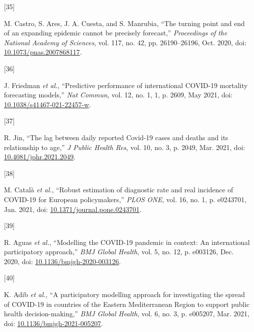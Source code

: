 \documentclass[
]{article}
\newlength{\cslhangindent}
\newlength{\csllabelwidth}
\newlength{\cslentryspacingunit} %
\newenvironment{CSLReferences}[2] %
 {%
  \setlength{\parindent}{0pt}
  \ifodd #1
  \let\oldpar\par
  \def\par{\hangindent=\cslhangindent\oldpar}
  \fi
  \setlength{\parskip}{#2\cslentryspacingunit}
 }%
 {}
\newcommand{\CSLLeftMargin}[1]{\parbox[t]{\csllabelwidth}{#1}}
\newcommand{\CSLRightInline}[1]{\parbox[t]{\linewidth - \csllabelwidth}{#1}\break}
\begin{document}
\begin{CSLReferences}{0}{0}
\leavevmode{}%
\CSLLeftMargin{{[}35{]} }
\CSLRightInline{M. Castro, S. Ares, J. A. Cuesta, and S. Manrubia,
{``The turning point and end of an expanding epidemic cannot be
precisely forecast,''} \emph{Proceedings of the National Academy of
Sciences}, vol. 117, no. 42, pp. 26190--26196, Oct. 2020, doi:
\href{https://doi.org/10.1073/pnas.2007868117}{10.1073/pnas.2007868117}.}

\leavevmode{}%
\CSLLeftMargin{{[}36{]} }
\CSLRightInline{J. Friedman \emph{et al.}, {``Predictive performance of
international {COVID-19} mortality forecasting models,''} \emph{Nat
Commun}, vol. 12, no. 1, 1, p. 2609, May 2021, doi:
\href{https://doi.org/10.1038/s41467-021-22457-w}{10.1038/s41467-021-22457-w}.}

\leavevmode{}%
\CSLLeftMargin{{[}37{]} }
\CSLRightInline{R. Jin, {``The lag between daily reported {Covid-19}
cases and deaths and its relationship to age,''} \emph{J Public Health
Res}, vol. 10, no. 3, p. 2049, Mar. 2021, doi:
\href{https://doi.org/10.4081/jphr.2021.2049}{10.4081/jphr.2021.2049}.}

\leavevmode{}%
\CSLLeftMargin{{[}38{]} }
\CSLRightInline{M. Català \emph{et al.}, {``Robust estimation of
diagnostic rate and real incidence of {COVID-19} for {European}
policymakers,''} \emph{PLOS ONE}, vol. 16, no. 1, p. e0243701, Jan.
2021, doi:
\href{https://doi.org/10.1371/journal.pone.0243701}{10.1371/journal.pone.0243701}.}

\leavevmode{}%
\CSLLeftMargin{{[}39{]} }
\CSLRightInline{R. Aguas \emph{et al.}, {``Modelling the {COVID-19}
pandemic in context: An international participatory approach,''}
\emph{BMJ Global Health}, vol. 5, no. 12, p. e003126, Dec. 2020, doi:
\href{https://doi.org/10.1136/bmjgh-2020-003126}{10.1136/bmjgh-2020-003126}.}

\leavevmode{}%
\CSLLeftMargin{{[}40{]} }
\CSLRightInline{K. Adib \emph{et al.}, {``A participatory modelling
approach for investigating the spread of {COVID-19} in countries of the
{Eastern Mediterranean Region} to support public health
decision-making,''} \emph{BMJ Global Health}, vol. 6, no. 3, p. e005207,
Mar. 2021, doi:
\href{https://doi.org/10.1136/bmjgh-2021-005207}{10.1136/bmjgh-2021-005207}.}


\end{CSLReferences}
\end{document}
